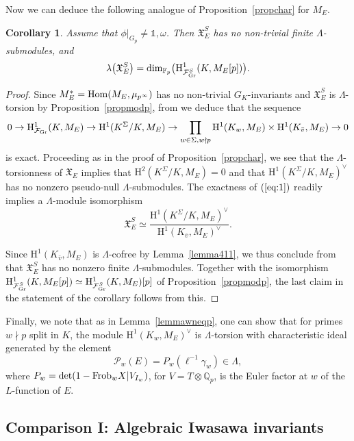 \documentclass[10pt]{amsart}
\numberwithin{equation}{section}
\newtheorem{cor}[theorem]{Corollary}
\theoremstyle{definition}
\theoremstyle{remark}
\newcommand{\Fcal}{\mathcal{F}}
\newcommand{\bQ}{\mathbb{Q}}
\newcommand{\rH}{\mathrm{H}}
\begin{document}
Now we can deduce the following analogue of Proposition~\ref{propchar} for $M_E$.

\begin{cor}\label{prop426} 
Assume that $\phi\vert_{G_{p}}\neq\mathds{1},\omega$. Then $\mathfrak{X}_E^S$ has no non-trivial finite $\Lambda$-submodules, and 
\[
\lambda\bigl(\mathfrak{X}_E^S\bigr)=\mathrm{dim}_{\mathbb{F}_p}\bigl(\rH^1_{\Fcal_{\rm Gr}^S}(K,M_E[p])\bigr).
\] 
\end{cor}

\begin{proof} 
Since $M_E^*={\rm Hom}(M_E,\mu_{p^\infty})$ has no non-trivial $G_K$-invariants and $\mathfrak{X}_E^S$ is $\Lambda$-torsion by Proposition~\ref{propmodp}, from \cite[Prop.~A.2]{pollack2011anticyclotomic} we deduce that the sequence
\begin{equation}\label{eq:1}
0 \rightarrow \rH^1_{\Fcal_{\rm Gr}}(K,M_E) \rightarrow \rH^{1}(K^{\Sigma}/K, M_E) \rightarrow \prod_{w\in\Sigma, w\nmid p}\rH^1(K_w,M_E)\times\rH^{1}(K_{\bar{v}}, M_E) \rightarrow 0
\end{equation}
is exact. Proceeding as in the proof of Proposition~\ref{propchar}, we see that the $\Lambda$-torsionness of $\mathfrak{X}_E$ implies that $\rH^{2}(K^{\Sigma}/K, M_E)=0$ and that $\rH^{1}(K^{\Sigma}/K, M_E)^{\vee}$ has no nonzero pseudo-null $\Lambda$-submodules. The exactness of $(\ref{eq:1})$ readily implies a $\Lambda$-module isomorphism 
\[
\mathfrak{X}_E^S\simeq\frac{\rH^1(K^\Sigma/K,M_E)^\vee}{\rH^{1}(K_{\bar{v}}, M_E)^\vee}.
\]
 
Since $\rH^1(K_{\bar{v}},M_E)$ is $\Lambda$-cofree by Lemma~\ref{lemma411}, we thus conclude from \cite[Lem.~2.6]{greenvats} that $\mathfrak{X}_E^S$ has no nonzero finite $\Lambda$-submodules. Together with the isomorphism  $\rH^1_{\Fcal_{\rm Gr}^S}(K,M_E[p]) \simeq \rH^1_{\Fcal_{\rm Gr}^S}(K,M_E)[p]$ of Proposition~\ref{propmodp}, the last claim in the statement
of the corollary follows from this.
\end{proof}


Finally, we note that as in Lemma~\ref{lemmawneqp}, one can show that for primes $w\nmid p$ split in $K$, the module $\rH^1(K_w,M_E)^\vee$ is $\Lambda$-torsion with characteristic ideal generated by the element
\[
\mathcal{P}_w(E)=P_w(\ell^{-1}\gamma_w)
\in\Lambda,
\]
where $P_w={\rm det}(1-{\rm Frob}_wX\vert V_{I_w})$, for $V=T\otimes\bQ_p$, is the Euler factor at $w$ of the $L$-function of $E$. 


\subsection{Comparison I: Algebraic Iwasawa invariants}
\end{document}
